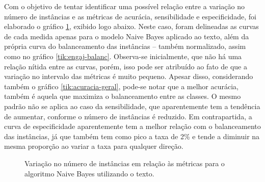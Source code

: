 \documentclass[oneside,openright,12pt]{ufsm_2015} %
\begin{document}
    \par Com o objetivo de tentar identificar uma possível relação entre a variação no número de instâncias e as métricas de acurácia, sensibilidade e especificidade, foi elaborado o gráfico \ref{tik:balanc-metricas}, exibido logo abaixo. Neste caso, foram delineadas as curvas de cada medida apenas para o modelo Naive Bayes aplicado ao texto, além da própria curva do balanceamento das instâncias -- também normalizado, assim como no gráfico \ref{tik:engaj-balanc}. Observa-se inicialmente, que não há uma relação nítida entre as curvas, porém, isso pode ser atribuído ao fato de que a variação no intervalo das métricas é muito pequeno. Apesar disso, considerando também o gráfico \ref{tik:acuracia-geral}, pode-se notar que a melhor acurácia, também é aquela que maximiza o balanceamento entre as classes. O mesmo padrão não se aplica ao caso da sensibilidade, que aparentemente tem a tendência de aumentar, conforme o número de instâncias é reduzido. Em contrapartida, a curva de especificidade aparentemente tem a melhor relação com o balanceamento das instâncias, já que também tem como pico a taxa de 2\% e tende a diminuir na mesma proporção ao variar a taxa para qualquer direção.

    \begin{figure}[!ht]
    \caption{Variação no número de instâncias em relação às métricas para o algoritmo Naive Bayes utilizando o texto.}
    \centering
    \label{tik:balanc-metricas}
    \end{figure}
    
\end{document}
